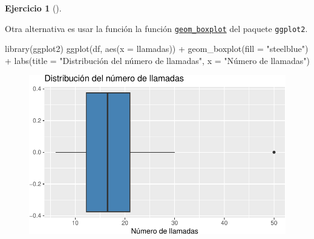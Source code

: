\documentclass[
  a4paper,
]{scrreport}
\newenvironment{Shaded}{\begin{snugshade}}{\end{snugshade}}
\newcommand{\AttributeTok}[1]{\textcolor[rgb]{0.40,0.45,0.13}{#1}}
\newcommand{\FunctionTok}[1]{\textcolor[rgb]{0.28,0.35,0.67}{#1}}
\newcommand{\NormalTok}[1]{\textcolor[rgb]{0.00,0.23,0.31}{#1}}
\newcommand{\SpecialCharTok}[1]{\textcolor[rgb]{0.37,0.37,0.37}{#1}}
\newcommand{\StringTok}[1]{\textcolor[rgb]{0.13,0.47,0.30}{#1}}
\theoremstyle{definition}
\newtheorem{exercise}{Ejercicio}[chapter]
\theoremstyle{remark}
\begin{document}
\begin{exercise}[]
\begin{enumerate}
\begin{tcolorbox}
\begin{figure}[H]
{  }

  \end{figure}

  \end{tcolorbox}

  \begin{tcolorbox}[enhanced jigsaw, coltitle=black, left=2mm, colback=white, leftrule=.75mm, toptitle=1mm, breakable, bottomrule=.15mm, titlerule=0mm, bottomtitle=1mm, title=\textcolor{quarto-callout-tip-color}{\faLightbulb}\hspace{0.5em}{Solución 2}, arc=.35mm, toprule=.15mm, rightrule=.15mm, colframe=quarto-callout-tip-color-frame, opacityback=0, colbacktitle=quarto-callout-tip-color!10!white, opacitybacktitle=0.6]

  Otra alternativa es usar la función la función
  \href{https://aprendeconalf.es/manual-r/07-graficos.html\#diagramas-de-cajas}{\texttt{geom\_boxplot}}
  del paquete \texttt{ggplot2}.

\begin{Shaded}
\begin{Highlighting}[]
\FunctionTok{library}\NormalTok{(ggplot2)}
\FunctionTok{ggplot}\NormalTok{(df, }\FunctionTok{aes}\NormalTok{(}\AttributeTok{x =}\NormalTok{ llamadas)) }\SpecialCharTok{+}
    \FunctionTok{geom\_boxplot}\NormalTok{(}\AttributeTok{fill =} \StringTok{"steelblue"}\NormalTok{) }\SpecialCharTok{+}
    \FunctionTok{labs}\NormalTok{(}\AttributeTok{title =} \StringTok{"Distribución del número de llamadas"}\NormalTok{, }\AttributeTok{x =} \StringTok{"Número de llamadas"}\NormalTok{)}
\end{Highlighting}
\end{Shaded}

  \begin{figure}[H]

  {\centering \includegraphics{03-frecuencias-graficos_files/figure-pdf/unnamed-chunk-12-1.pdf}

}
\end{figure}
\end{tcolorbox}
\end{enumerate}
\end{exercise}
\end{document}
